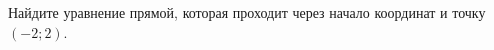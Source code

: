 \begin{ex}
	\begin{condition}
		Найдите уравнение прямой, которая проходит через начало координат и точку \( (-2;2) \).
	\end{condition}
\end{ex}
